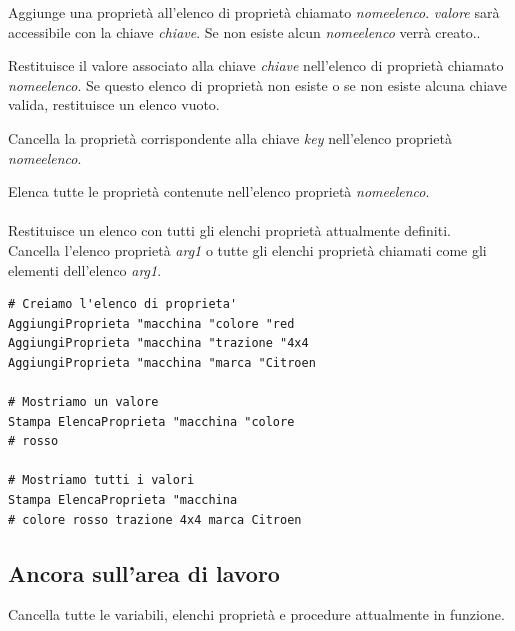 Aggiunge una proprietà all'elenco di proprietà chiamato \textit{nomeelenco}. \textit{valore} sarà accessibile con la chiave \textit{chiave}. Se non esiste alcun \textit{nomeelenco} verrà creato.. 

Restituisce il valore associato alla chiave \textit{chiave} nell'elenco di proprietà chiamato \textit{nomeelenco}. Se questo elenco di proprietà non esiste o se non esiste alcuna chiave valida, restituisce un elenco vuoto.

Cancella la proprietà corrispondente alla chiave \textit{key} nell'elenco proprietà \textit{nomeelenco}.

Elenca tutte le proprietà contenute nell'elenco proprietà \textit{nomeelenco}.\\ \\

Restituisce un elenco con tutti gli elenchi proprietà attualmente definiti.\\

 Cancella l'elenco proprietà \textit{arg1} o tutte gli elenchi proprietà chiamati come gli elementi dell'elenco \textit{arg1}.\\

\begin{lstlisting}[caption="Un esempio di impiego dell'elenco di proprietà"]
# Creiamo l'elenco di proprieta'
AggiungiProprieta "macchina "colore "red
AggiungiProprieta "macchina "trazione "4x4
AggiungiProprieta "macchina "marca "Citroen

# Mostriamo un valore
Stampa ElencaProprieta "macchina "colore
# rosso

# Mostriamo tutti i valori
Stampa ElencaProprieta "macchina
# colore rosso trazione 4x4 marca Citroen
\end{lstlisting}


\subsection{Ancora sull'area di lavoro} %
 Cancella tutte le variabili, elenchi proprietà e procedure attualmente in funzione.\\

